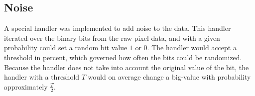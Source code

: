 \subsection{Noise}
A special handler was implemented to add noise to the data. This handler iterated over the binary bits from the raw pixel data, and with a given probability could set a random bit value \(1\) or \(0\). The handler would accept a threshold in percent, which governed how often the bits could be randomized. Because the handler does not take into account the original value of the bit, the handler with a threshold \(T\) would on average change a big-value with probability approximately \(\frac{T}{2}\).